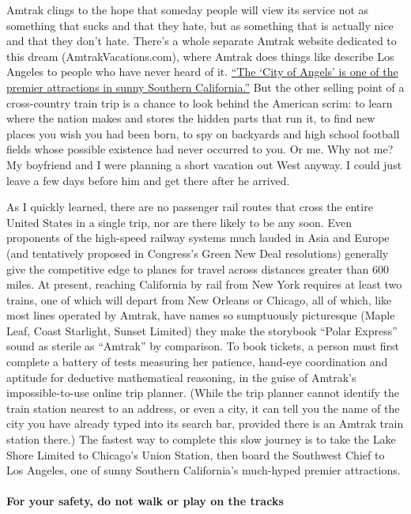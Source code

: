 Amtrak clings to the hope that someday people will view its service not
as something that sucks and that they hate, but as something that is
actually nice and that they don't hate. There's a whole separate Amtrak
website dedicated to this dream (AmtrakVacations.com), where Amtrak does
things like describe Los Angeles to people who have never heard of it.
\href{https://www.amtrakvacations.com/destination/los-angeles-ca/}{``The
`City of Angels' is one of the premier attractions in sunny Southern
California.''} But the other selling point of a cross-country train trip
is a chance to look behind the American scrim: to learn where the nation
makes and stores the hidden parts that run it, to find new places you
wish you had been born, to spy on backyards and high school football
fields whose possible existence had never occurred to you. Or me. Why
not me? My boyfriend and I were planning a short vacation out West
anyway. I could just leave a few days before him and get there after he
arrived.

As I quickly learned, there are no passenger rail routes that cross the
entire United States in a single trip, nor are there likely to be any
soon. Even proponents of the high-speed railway systems much lauded in
Asia and Europe (and tentatively proposed in Congress's Green New Deal
resolutions) generally give the competitive edge to planes for travel
across distances greater than 600 miles. At present, reaching California
by rail from New York requires at least two trains, one of which will
depart from New Orleans or Chicago, all of which, like most lines
operated by Amtrak, have names so sumptuously picturesque (Maple Leaf,
Coast Starlight, Sunset Limited) they make the storybook ``Polar
Express'' sound as sterile as ``Amtrak'' by comparison. To book tickets,
a person must first complete a battery of tests measuring her patience,
hand-eye coordination and aptitude for deductive mathematical reasoning,
in the guise of Amtrak's impossible-to-use online trip planner. (While
the trip planner cannot identify the train station nearest to an
address, or even a city, it can tell you the name of the city you have
already typed into its search bar, provided there is an Amtrak train
station there.) The fastest way to complete this slow journey is to take
the Lake Shore Limited to Chicago's Union Station, then board the
Southwest Chief to Los Angeles, one of sunny Southern California's
much-hyped premier attractions.

\hypertarget{for-your-safety-do-not-walk-or-play-on-the-tracks}{%
\paragraph{For your safety, do not walk or play on the
tracks}\label{for-your-safety-do-not-walk-or-play-on-the-tracks}}

